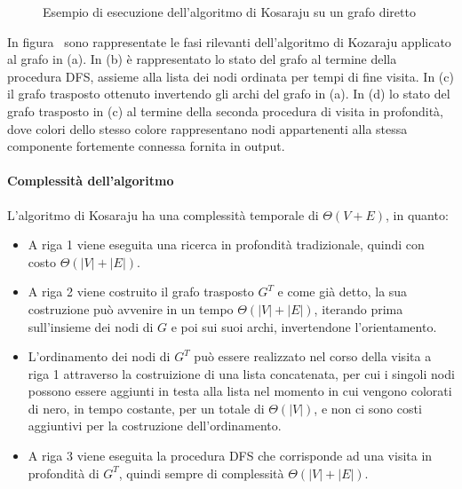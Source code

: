 \begin{figure}
    \resizebox{!}{4cm}{
        \centering
        }
    \label{fig:kozaraju_example_1}
\end{figure}

\begin{figure}
    \resizebox{!}{4cm}{
        \centering
        }
    \label{fig:kozaraju_example_2}
    \caption{Esempio di esecuzione dell'algoritmo di Kosaraju su un grafo diretto}
\end{figure}

In figura~\cite{fig:kozaraju_example_2} sono rappresentate le fasi rilevanti dell'algoritmo di Kozaraju
applicato al grafo in (a).
In (b) \`e rappresentato lo stato del grafo al termine della procedura DFS, assieme alla lista dei nodi ordinata
per tempi di fine visita.
In (c) il grafo trasposto ottenuto invertendo gli archi del grafo in (a).
In (d) lo stato del grafo trasposto in (c) al termine della seconda procedura di visita in
profondit\`a, dove colori dello stesso colore rappresentano nodi appartenenti alla stessa componente fortemente
connessa fornita in output.

\paragraph{Complessit\`a dell'algoritmo}
L'algoritmo di Kosaraju ha una complessit\`a temporale di $\Theta(V + E)$, in quanto:
\begin{itemize}
    \item A riga 1 viene eseguita una ricerca in profondit\`a tradizionale, quindi con costo $\Theta(|V| + |E|)$.
    \item A riga 2 viene costruito il grafo trasposto $G^T$ e come gi\`a detto, la sua costruzione pu\`o avvenire in
    un tempo $\Theta(|V| + |E|)$, iterando prima sull'insieme dei nodi di $G$ e poi sui suoi archi, invertendone
    l'orientamento.
    \item L'ordinamento dei nodi di $G^T$ pu\`o essere realizzato nel corso della visita a riga 1 attraverso la
    costruizione di una lista concatenata, per cui i singoli nodi possono essere aggiunti in testa alla lista nel
    momento in cui vengono colorati di nero, in tempo costante, per un totale di $\Theta(|V|)$, e non ci sono costi
    aggiuntivi per la costruzione dell'ordinamento.
    \item A riga 3 viene eseguita la procedura DFS che corrisponde ad una visita in profondit\`a di $G^T$, quindi
    sempre di complessit\`a $\Theta(|V| + |E|)$.
\end{itemize}

